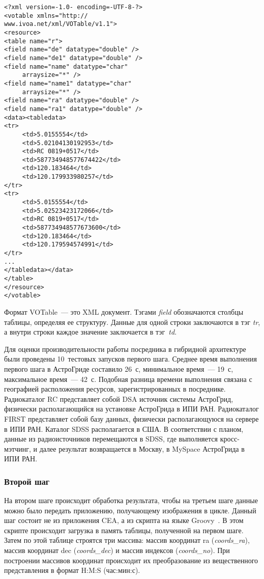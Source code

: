 \begin{multicols}{2}
\noindent
\begin{verbatim}
<?xml version=-1.0- encoding=-UTF-8-?>
<votable xmlns="http://
www.ivoa.net/xml/VOTable/v1.1">
<resource>
<table name="r">
<field name="de" datatype="double" />
<field name="de1" datatype="double" />
<field name="name" datatype="char"
     arraysize="*" />
<field name="name1" datatype="char"
     arraysize="*" />
<field name="ra" datatype="double" />
<field name="ra1" datatype="double" />
<data><tabledata>
<tr>
     <td>5.0155554</td>
     <td>5.02104130192953</td>
     <td>RC 0819+0517</td>
     <td>587734948577674422</td>
     <td>120.183464</td>
     <td>120.179933980257</td>
</tr>
<tr>
     <td>5.0155554</td>
     <td>5.02523423172066</td>
     <td>RC 0819+0517</td>
     <td>587734948577673600</td>
     <td>120.183464</td>
     <td>120.179594574991</td>
</tr>
...
</tabledata></data>
</table>
</resource>
</votable>
\end{verbatim}


     Формат VOTable~--- это XML документ. Тэгами \textit{field} обозначаются столбцы
таблицы, определяя ее структуру. Данные для одной строки заключаются в тэг \textit{tr}, а
внутри строки каждое значение заключается в тэг~\textit{td}.

     Для оценки производительности работы посредника в гибридной архитектуре были
проведены 10~тестовых запусков первого шага. Среднее время выполнения первого шага
в АстроГриде составило 26~с, минимальное время~--- 19~с, максимальное
время~--- 42~с. Подобная разница времени выполнения связана с географией
расположения ресурсов, зарегистрированных в посреднике. Радиокаталог RC
представляет собой DSA источник системы Аст\-ро\-Грид, физически располагающийся на
установке АстроГрида в ИПИ РАН. Радиокаталог FIRST представляет собой базу данных,
физически располагающуюся на сервере в ИПИ РАН. Каталог SDSS располагается в
США.  В соответствии с планом, данные из радиоисточников перемещаются в SDSS, где
выполняется кросс-мэтчинг, и далее результат возвращается в Москву, в MySpace
АстроГрида в ИПИ РАН.

\subsubsection{Второй шаг}

     На втором шаге происходит обработка результата, чтобы на третьем шаге данные
можно было передать приложению, получающему изображения в цикле.
     Данный шаг состоит не из приложения CEA, а из скрипта на языке
Groovy~\cite{Groov}. В этом скрипте происходит загрузка в память таблицы, полученной
на первом шаге. Затем по этой таблице строятся три массива: массив координат ra
(\textit{coords\_ra}), массив координат dec (\textit{coords\_dec}) и массив индексов
(\textit{coords\_no}). При построении массивов координат происходит их преобразование
из вещественного представления в формат H:M:S (час:мин:с).


\end{multicols}
